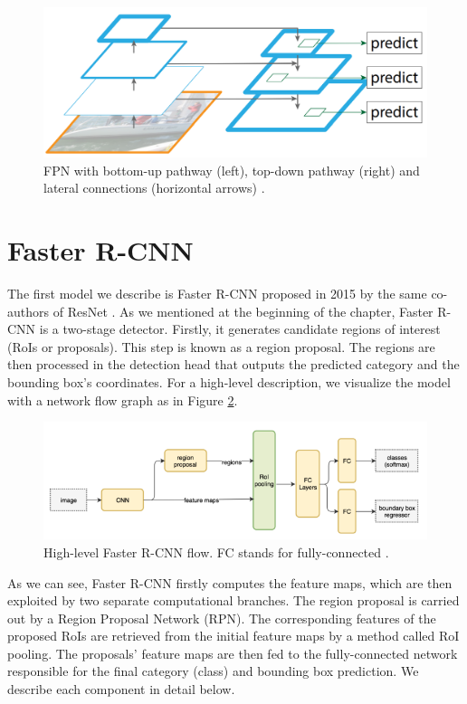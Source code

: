 \begin{figure}[h]
    \centering
    \includegraphics[width=0.6\linewidth]{Sources/Figures/fpn.png}
    \caption{FPN with bottom-up pathway (left), top-down pathway (right) and lateral connections (horizontal arrows) \cite{fpn}.}
    \label{fig:fpn}
\end{figure}

\section{Faster R-CNN}
The first model we describe is Faster R-CNN proposed in 2015 by the same co-authors of ResNet \cite{fasterrcnn}. As we mentioned at the beginning of the chapter, Faster R-CNN is a two-stage detector. Firstly, it generates candidate regions of interest (RoIs or proposals). This step is known as a region proposal. The regions are then processed in the detection head that outputs the predicted category and the bounding box's coordinates.  For a high-level description, we visualize the model with a network flow graph as in Figure \ref{fig:fasterrcnn}. 

\begin{figure}[h]
    \centering
    \includegraphics[width=\linewidth]{Sources/Figures/fasterrcnn.png}
    \caption{High-level Faster R-CNN flow. FC stands for fully-connected \cite{huifasterrcnn}.}
    \label{fig:fasterrcnn}
\end{figure}

As we can see, Faster R-CNN firstly computes the feature maps, which are then exploited by two separate computational branches. The region proposal is carried out by a Region Proposal Network (RPN). The corresponding features of the proposed RoIs are retrieved from the initial feature maps by a method called RoI pooling. The proposals' feature maps are then fed to the fully-connected network responsible for the final category (class) and bounding box prediction. We describe each component in detail below.

